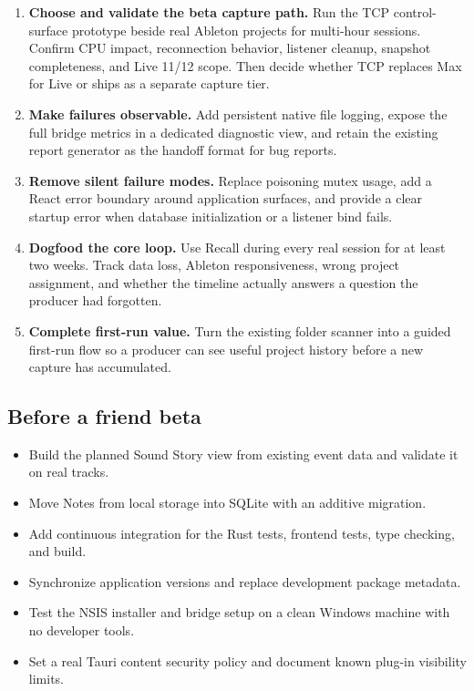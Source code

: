\documentclass[11pt,letterpaper]{article}
\begin{document}
\begin{enumerate}
  \item \textbf{Choose and validate the beta capture path.} Run the TCP control-surface
        prototype beside real Ableton projects for multi-hour sessions. Confirm CPU impact,
        reconnection behavior, listener cleanup, snapshot completeness, and Live 11/12 scope.
        Then decide whether TCP replaces Max for Live or ships as a separate capture tier.
  \item \textbf{Make failures observable.} Add persistent native file logging, expose the
        full bridge metrics in a dedicated diagnostic view, and retain the existing report
        generator as the handoff format for bug reports.
  \item \textbf{Remove silent failure modes.} Replace poisoning mutex usage, add a React
        error boundary around application surfaces, and provide a clear startup error when
        database initialization or a listener bind fails.
  \item \textbf{Dogfood the core loop.} Use Recall during every real session for at least
        two weeks. Track data loss, Ableton responsiveness, wrong project assignment, and
        whether the timeline actually answers a question the producer had forgotten.
  \item \textbf{Complete first-run value.} Turn the existing folder scanner into a guided
        first-run flow so a producer can see useful project history before a new capture has
        accumulated.
\end{enumerate}

\subsection{Before a friend beta}

\begin{itemize}
  \item Build the planned Sound Story view from existing event data and validate it on real tracks.
  \item Move Notes from local storage into SQLite with an additive migration.
  \item Add continuous integration for the Rust tests, frontend tests, type checking, and build.
  \item Synchronize application versions and replace development package metadata.
  \item Test the NSIS installer and bridge setup on a clean Windows machine with no developer tools.
  \item Set a real Tauri content security policy and document known plug-in visibility limits.
\end{itemize}
\end{document}
